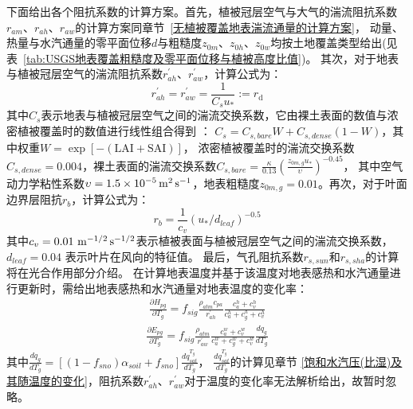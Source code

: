 下面给出各个阻抗系数的计算方案。首先，植被冠层空气与大气的湍流阻抗系数$r_{am}$、$r_{ah}$、$r_{aw}$的计算方案同章节~\ref{无植被覆盖地表湍流通量的计算方案}，
动量、热量与水汽通量的零平面位移$d$与粗糙度$z_{0m}$、$z_{0h}$、$z_{0w}$均按土地覆盖类型给出(见
表~\ref{tab:USGS地表覆盖粗糙度及零平面位移与植被高度比值})。
其次，对于地表与植被冠层空气的湍流阻抗系数$r_{ah}^\prime$、$r_{aw}^\prime$，计算公式为：
\begin{equation}
r_{a h}^{\prime}=r_{a w}^{\prime}=\frac{1}{C_{s} u_{*}}:=r_{\mathrm{d}}
\end{equation}
其中$C_s$表示地表与植被冠层空气之间的湍流交换系数，它由裸土表面的数值与浓密植被覆盖时的数值进行线性组合得到 \citep{zeng2005vegetation}：
$C_s=C_{s,bare}W+C_{s,dense}\left(1-W\right)$，其中权重$W=\exp {\left[-(\text{LAI}+\text{SAI})\right]}$，
浓密植被覆盖时的湍流交换系数$C_{s,dense}=0.004$，裸土表面的湍流交换系数$C_{s,bare}=\frac{\kappa}{0.13}\left(\frac{z_{0m,g}u_\ast}{\upsilon}\right)^{-0.45}$，
其中空气动力学粘性系数$\upsilon=1.5\times{10}^{-5}\,\rm m^2\,s^{-1}$，地表粗糙度$z_{0m,g}=0.01$。再次，对于叶面边界层阻抗$r_b$，计算公式为：
\begin{equation}
r_{b}=\frac{1}{c_{v}}\left(u_{*} / d_{{leaf }}\right)^{-0.5}
\end{equation}
其中$c_v=0.01\ \rm m^{-1/2}\,s^{-1/2}$表示植被表面与植被冠层空气之间的湍流交换系数，$d_{leaf}=0.04$ 表示叶片在风向的特征值。
最后，气孔阻抗系数$r_{s,sun}$和$r_{s,sha}$的计算将在光合作用部分介绍。
在计算地表温度并基于该温度对地表感热和水汽通量进行更新时，需给出地表感热和水汽通量对地表温度的变化率：
\begin{equation}
\begin{array}{c} \frac{\partial H_{p g}}{\partial T_{g}}=f_{sig} \frac{\rho_{atm} c_{p a}}{r_{a h}^{\prime}} 
     \frac{c_{a}^{h}+c_{v}^{h}}{c_{a}^{h}+c_{g}^{h}+c_{v}^{h}}\end{array}
\end{equation}
\begin{equation}
\begin{array}{c}\frac{\partial E_{p g}}{\partial T_{g}}=f_{sig}
      \frac{\rho_{atm}}{r_{a w}^{\prime}} \frac{c_{a}^{w}+c_{v}^{w}}{c_{a}^{w}+c_{g}^{w}+c_{v}^{w}} \frac{d q_{g}}{d T_{g}}\end{array}
\end{equation}
其中$\frac{dq_g}{dT_g}=\left[\left(1-f_{sno}\right)\alpha_{soil}+f_{sno}\right]\frac{dq_{sat}^{T_g}}{dT_g}$，
$\frac{dq_{sat}^{T_g}}{dT_g}$的计算见章节 \ref{饱和水汽压(比湿)及其随温度的变化}，阻抗系数$r_{ah}^\prime$、$r_{aw}^\prime$对于温度的变化率无法解析给出，故暂时忽略。


